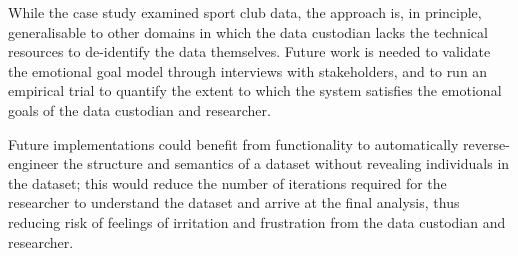 While the case study examined sport club data, the approach is, in
principle, generalisable to other domains in which the data custodian
lacks the technical resources to de-identify the data themselves. Future
work is needed to validate the emotional goal model through interviews
with stakeholders, and to run an empirical trial to quantify the extent
to which the system satisfies the emotional goals of the data custodian
and researcher.

Future implementations could benefit from functionality to automatically
reverse-engineer the structure and semantics of a dataset without
revealing individuals in the dataset; this would reduce the number of
iterations required for the researcher to understand the dataset and
arrive at the final analysis, thus reducing risk of feelings of
irritation and frustration from the data custodian and researcher.

\newpage{}
